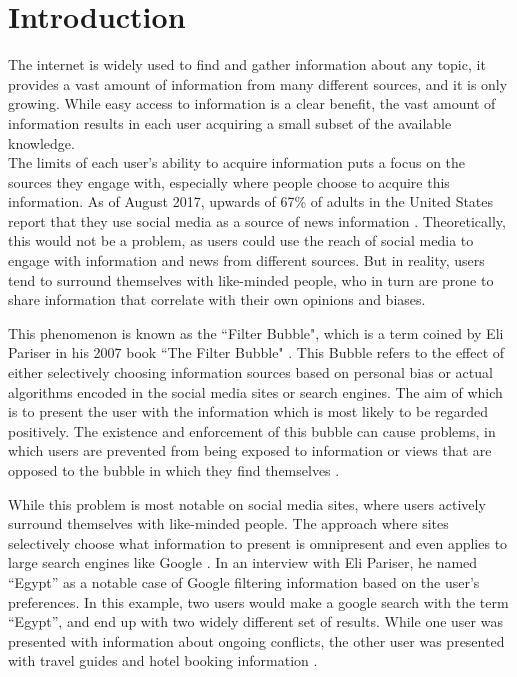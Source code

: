 \chapter{Introduction}
The internet is widely used to find and gather information about any topic, it
provides a vast amount of information from many different sources, and it is
only growing.
While easy access to information is a clear benefit, the vast amount of
information results in each user acquiring a small subset of the available
knowledge.\\
The limits of each user's ability to acquire information puts a focus on the
sources they engage with, especially where people choose to acquire this
information.
As of August 2017, upwards of 67\% of adults in the United States report that
they use social media as a source of news information \citep{journalism2017}.
Theoretically, this would not be a problem, as users could use the reach of
social media to engage with information and news from different sources.
But in reality, users tend to surround themselves with like-minded people, who
in turn are prone to share information that correlate with their own opinions
and biases.\nl

This phenomenon is known as the ``Filter Bubble", which is a term coined by Eli
Pariser in his 2007 book ``The Filter Bubble" \citep{pariser2011filter}.
This Bubble refers to the effect of either selectively choosing information
sources based on personal bias or actual algorithms encoded in the social media
sites or search engines.
The aim of which is to present the user with the information which is most
likely to be regarded positively.
The existence and enforcement of this bubble can cause problems, in which users
are prevented from being exposed to information or views that are opposed to the
bubble in which they find themselves \citep[p.59-73]{pariser2011filter}.\nl

While this problem is most notable on social media sites, where users actively
surround themselves with like-minded people.
The approach where sites selectively choose what information to present is
omnipresent and even applies to large search engines like Google
\citep{filterBubbleDef}.
In an interview with Eli Pariser, he named ``Egypt'' as a notable case of
Google filtering information based on the user's preferences.
In this example, two users would make a google search with the term ``Egypt'',
and end up with two widely different set of results.
While one user was presented with information about ongoing conflicts, the other
user was presented with travel guides and hotel booking information
\citep{nusSduSearch}.